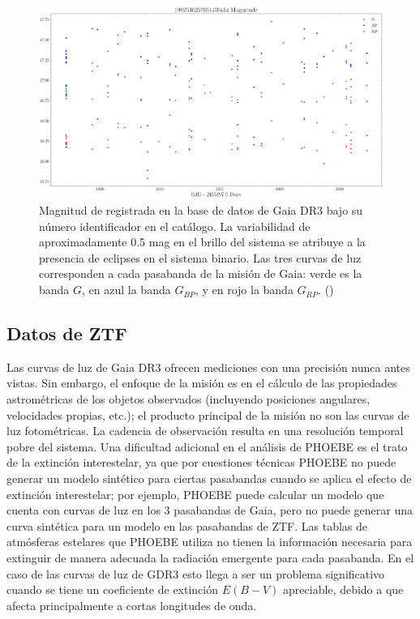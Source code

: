 \begin{figure}[!ht]
	\centering
	\includegraphics[scale=0.38]{Muestra/Secciones/Figures/GDR3-Light-Curves.png}
	\caption{Magnitud de \atoObjId registrada en la base de datos de Gaia DR3
	bajo su número identificador en el catálogo. La variabilidad de
	aproximadamente 0.5 mag en el brillo del sistema se atribuye a la presencia
	de eclipses en el sistema binario. Las tres curvas de luz corresponden a
	cada pasabanda de la misión de Gaia: verde es la banda $G$, en azul la banda
	$G_{BP}$, y en rojo la banda $G_{RP}$.
	()}
	\label{gdr3AtoObjLightCurves}
\end{figure}

\subsection{Datos de ZTF}

Las curvas de luz de Gaia DR3 ofrecen mediciones con una precisión nunca antes
vistas. Sin embargo, el enfoque de la misión es en el cálculo de las propiedades
astrométricas de los objetos observados (incluyendo posiciones angulares,
velocidades propias, etc.); el producto principal de la misión no son las curvas
de luz fotométricas. La cadencia de observación resulta en una resolución
temporal pobre del sistema. Una dificultad adicional en el análisis de PHOEBE es
el trato de la extinción interestelar, ya que por cuestiones técnicas PHOEBE no
puede generar un modelo sintético para ciertas pasabandas cuando se aplica el
efecto de extinción interestelar; por ejemplo, PHOEBE puede calcular un
modelo que cuenta con curvas de luz en los 3 pasabandas de Gaia, pero no puede
generar una curva sintética para un modelo en las pasabandas de ZTF. Las tablas
de atmósferas estelares que PHOEBE utiliza no tienen la información necesaria
para extinguir de manera adecuada la radiación emergente para cada pasabanda.
En el caso de las curvas de luz de GDR3 esto llega a ser un problema
significativo cuando se tiene un coeficiente de extinción $E(B - V)$ apreciable,
debido a que afecta principalmente a cortas longitudes de onda.

